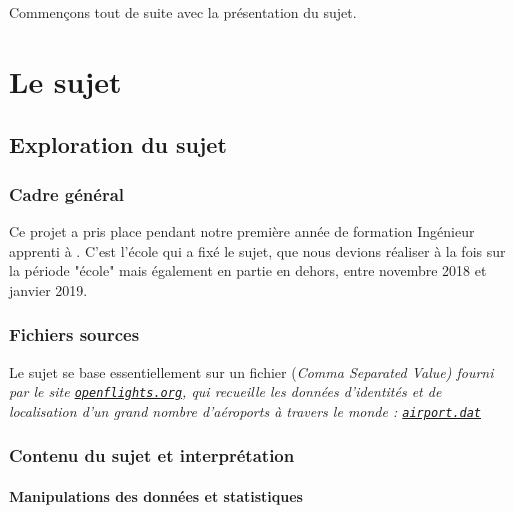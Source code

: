 \documentclass[a4paper, 12pt]{report}
\newcommand{\tech}[1]{\sf{#1}}
\renewcommand{\tn}{\tech{TELECOM Nancy}}
\newcommand{\ext}[1]{\sc{#1}}
\newcommand{\en}[1]{\it{#1}}
\begin{document}
Commençons tout de suite avec la présentation du sujet.



\part{Le sujet}

\chapter{Exploration du sujet}

\section{Cadre général}

Ce projet a pris place pendant notre première année de formation Ingénieur apprenti à \tn{}. C'est l'école qui a fixé le sujet, que nous devions réaliser à la fois sur la période "école" mais également en partie en dehors, entre novembre 2018 et janvier 2019.

\section{Fichiers sources}

Le sujet se base essentiellement sur un fichier \ext{csv} (\en{Comma Separated Value}) fourni par le site \href{https://openflights.org/data.html}{\tt{openflights.org}}, qui recueille les données d'identités et de localisation d'un grand nombre d'aéroports à travers le monde : \href{https://raw.githubusercontent.com/jpatokal/openflights/master/data/airports.dat}{\tt{airport.dat}}

\section{Contenu du sujet et interprétation}

\subsection{Manipulations des données et statistiques}
\end{document}
